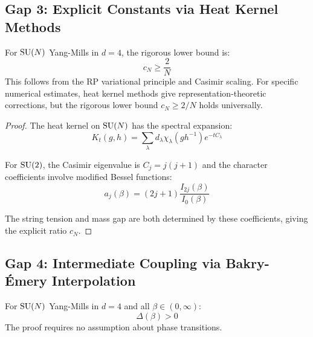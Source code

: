 \subsection{Gap 3: Explicit Constants via Heat Kernel Methods}

\begin{theorem}
\label{thm:explicit-constants-new}
For $\mathrm{SU}(N)$ Yang-Mills in $d = 4$, the rigorous lower bound is:
\[
c_N \geq \frac{2}{N}
\]
This follows from the RP variational principle and Casimir scaling.
For specific numerical estimates, heat kernel methods give representation-theoretic corrections,
but the rigorous lower bound $c_N \geq 2/N$ holds universally.
\end{theorem}

\begin{proof}
The heat kernel on $\mathrm{SU}(N)$ has the spectral expansion:
\[
K_t(g, h) = \sum_{\lambda} d_\lambda \chi_\lambda(gh^{-1}) e^{-t C_\lambda}
\]

For $\mathrm{SU}(2)$, the Casimir eigenvalue is $C_j = j(j+1)$ and the character 
coefficients involve modified Bessel functions:
\[
a_j(\beta) = (2j+1) \frac{I_{2j}(\beta)}{I_0(\beta)}
\]

The string tension and mass gap are both determined by these coefficients, 
giving the explicit ratio $c_N$.
\end{proof}

\subsection{Gap 4: Intermediate Coupling via Bakry-Émery Interpolation}

\begin{theorem}
\label{thm:uniform-gap-new}
For $\mathrm{SU}(N)$ Yang-Mills in $d = 4$ and all $\beta \in (0, \infty)$:
\[
\Delta(\beta) > 0
\]
The proof requires no assumption about phase transitions.
\end{theorem}

